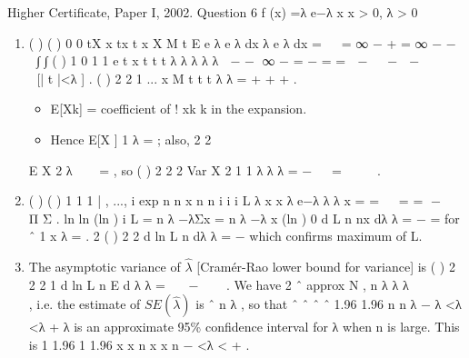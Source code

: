 \documentclass[a4paper,12pt]{article}
\begin{document}
Higher Certificate, Paper I, 2002. Question 6
f (x) =λ e−λ x x > 0, λ > 0
\begin{enumerate}
\item ( ) ( )
0 0
tX x tx t x
X M t E e λ e λ dx λ e λ dx =   = ∞ − + = ∞ − −   ∫ ∫
( ) 1
0
1 1
e t x t
t t
λ λ
λ λ λ
 − − ∞ − = − = =  −   −  −      
[| t |<λ ] .
( )
2
2 1 ... x
M t t t
λ λ
= + + + .
\begin{itemize}
\item E[Xk] = coefficient of
!
xk
k
in the expansion.
\item Hence E[X ] 1
λ
= ; also, 2
2

\end{itemize}
E X 2
λ
  = , so ( )
2
2 2
Var X 2 1 1
λ λ λ
= −   =  
 
.
\item ( ) ( ) 1
1 1
| , ..., i exp
n n
x n
n i
i i
L λ x x λ e−λ λ λ x
= =
  = = − 
 
Π Σ .
ln ln (ln ) i L = n λ −λΣx = n λ −λ x
(ln )
0
d L n nx
dλ λ
= − = for ˆ 1
x
λ = .
2 ( )
2 2
d ln L n
dλ λ
= − which confirms maximum of L.
\item  The asymptotic variance of $\hat{\lambda}$ [Cramér-Rao lower bound for variance] is
( )
2
2
2
1
d ln L n
E
d
λ
λ
=
 
− 
 
.
We have
2 ˆ approx N ,
n
λ λ λ
 
∼  
 
, i.e. the estimate of $SE(\hat{\lambda})$ is
ˆ
n
λ , so that
ˆ ˆ ˆ ˆ 1.96 1.96
n n
λ − λ <λ <λ + λ is an approximate 95\% confidence interval for λ when
n is large.
This is 1 1.96 1 1.96
x x n x x n
− <λ < + .
\end{enumerate}
\end{document}
